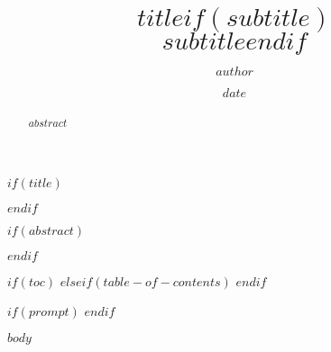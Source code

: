 \documentclass[12pt,paper=letter]{article}
\title{$title$$if(subtitle)$\\\large{$subtitle$}$endif$}
\author{$author$}
\date{$date$}
\begin{document}
    $if(title)$
    \maketitle
    $endif$

    $if(abstract)$
    \begin{abstract}
        $abstract$
    \end{abstract}
    $endif$

    $if(toc)$
    \tableofcontents
    $elseif(table-of-contents)$
    \tableofcontents
    $endif$

    $if(prompt)$
    $endif$

    $body$
\end{document}

